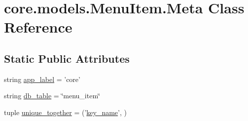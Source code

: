 \hypertarget{classcore_1_1models_1_1MenuItem_1_1Meta}{\section{core.\-models.\-Menu\-Item.\-Meta Class Reference}
\label{classcore_1_1models_1_1MenuItem_1_1Meta}
}
\subsection*{Static Public Attributes}
\begin{DoxyCompactItemize}
\item 
string \hyperlink{classcore_1_1models_1_1MenuItem_1_1Meta_a139c557f4e05209ac70b495aece021b7}{app\-\_\-label} = 'core'
\item 
string \hyperlink{classcore_1_1models_1_1MenuItem_1_1Meta_a200e7835b578293b589bfefa49a237c4}{db\-\_\-table} = \char`\"{}menu\-\_\-item\char`\"{}
\item 
tuple \hyperlink{classcore_1_1models_1_1MenuItem_1_1Meta_ab18d0cc030946e61e3aaf5ef3d063322}{unique\-\_\-together} = ('\hyperlink{classcore_1_1models_1_1MenuItem_a6eccff1165c95be4b9c0efee213e3878}{key\-\_\-name}', )
\end{DoxyCompactItemize}


